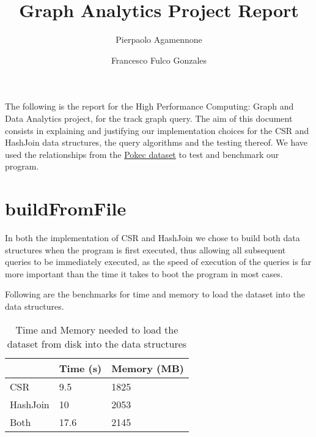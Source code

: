 \documentclass[twocolumn]{article}
\title{Graph Analytics Project Report}
\author{
Pierpaolo Agamennone
\and 
Francesco Fulco Gonzales
}
\date{} %
\begin{document}

\maketitle

\vspace{-3mm}
\begin{onecolabstract}
The following is the report for the High Performance Computing: Graph and Data Analytics project, for the track graph query. The aim of this document consists in explaining and justifying our implementation choices for the CSR and HashJoin data structures, the query algorithms and the testing thereof.
We have used the relationships from the \href{https://snap.stanford.edu/data/soc-Pokec.html}{Pokec dataset} to test and benchmark our program.
\smallskip
\noindent

\end{onecolabstract}\bigskip

\section{buildFromFile}

In both the implementation of CSR and HashJoin we chose to build both data structures when the program is first executed, thus allowing all subsequent queries to be immediately executed, as the speed of execution of the queries is far more important than the time it takes to boot the program in most cases. 


Following are the benchmarks for time and memory to load the dataset into the data structures.

\begin{table}[h]
\caption{Time and Memory needed to load the dataset from disk into the data structures}
\begin{tabular}{L{1.7in}C{.7in}C{.7in}}\toprule
 & Time (s) & Memory (MB) \\\midrule
CSR & 9.5 & 1825\\\midrule
HashJoin & 10 & 2053\\\midrule
Both & 17.6 & 2145\\\bottomrule
\end{tabular}
\end{table}
\end{document}
